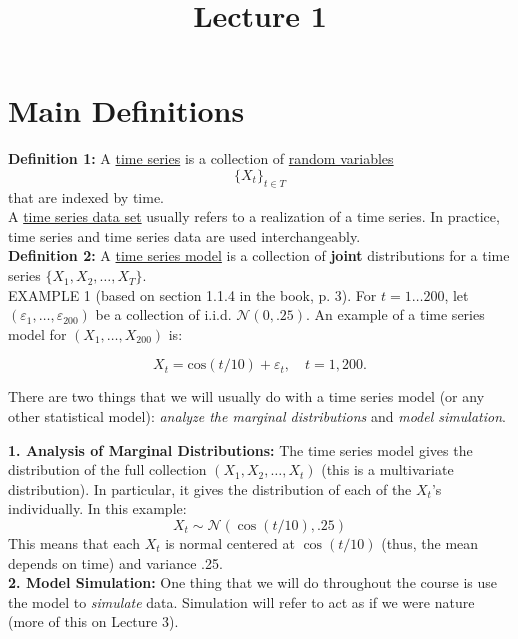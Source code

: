 \documentclass{article}
\begin{document}
\onehalfspace

\title{Lecture 1}
\date{}
\maketitle


\section{Main Definitions}

\textbf{Definition 1:} A \underline{time series} is a collection of \underline{random variables} 
\[\{ X_t \}_{t \in T}\]
that are indexed by time.  \\

A \underline{time series data set} usually refers to a realization of a time series. In practice, time series and time series data are used interchangeably.  \\


\noindent \textbf{Definition 2:} A \underline{time series model} is a collection of \textbf{joint} distributions for a time series $\{X_1, X_2, \ldots, X_{T}\}$.\\

{\scshape EXAMPLE 1} (based on section 1.1.4 in the book, p. 3). For $t=1 \ldots 200$, let $(\varepsilon_{1}, \ldots, \varepsilon_{200})$ be a collection of i.i.d. $\mathcal{N}(0,.25)$.  An example of a time series model for $(X_1, \ldots , X_{200})$ is:

\[ X_t = \textrm{cos}(t/10) + \varepsilon_t, \quad t=1, 200. \]

There are two things that we will usually do with a time series model (or any other statistical model): \emph{analyze the marginal distributions} and \emph{model simulation}. 

\textbf{1. Analysis of Marginal Distributions:} The time series model gives the distribution of the full collection $(X_1, X_2, \ldots, X_t)$ (this is a multivariate distribution). In particular, it gives the distribution of each of the $X_t$\textquoteright s individually. In this example:
\[ X_t \sim \mathcal{N}(\cos(t/10), .25) \]
This means that each $X_t$ is normal centered at $\cos(t/10)$ (thus, the mean depends on time) and variance .25. \\

\textbf{2. Model Simulation:} One thing that we will do throughout the course is use the model to \emph{simulate} data. Simulation will refer to act as if we were nature (more of this on Lecture 3).\\
\end{document}

